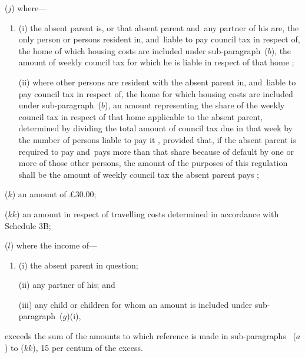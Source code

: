 \documentclass[12pt,a4paper]{article}
\begin{document}
\begin{enumerate}

($j$) where—
\begin{enumerate}\item[]
(i) the absent parent is, or that absent parent and~any partner of his are, the only person or persons resident in, and~liable to pay council tax in respect of, the home of which housing costs are included under sub-paragraph~($b$), the amount of weekly council tax for which he is liable in respect of that home%
;

(ii) where other persons are resident with the absent parent in, and~liable to pay council tax in respect of, the home for which housing costs are included under sub-paragraph~($b$), an amount representing the share of the weekly council tax in respect of that home applicable to the absent parent, determined by dividing the total amount of council tax due in that week by the number of persons liable to pay it%
, provided that, if the absent parent is required to pay and~pays more than that share because of default by one or more of those other persons, the amount of the purposes of this regulation shall be the amount of weekly council tax the absent parent pays%
;
\end{enumerate}

($k$) an amount of 
£30$.$00; %

($kk$) an amount in respect of travelling costs determined in accordance with Schedule 3B;

($l$) where the income of—
\begin{enumerate}\item[]
(i) the absent parent in question;

(ii) any partner of his; and

(iii) any child or children for whom an amount is included under sub-paragraph~($g$)(i),
\end{enumerate}
exceeds the sum of the amounts to which reference is made in sub-paragraphs~
($a$) to ($kk$),  %
15 per centum %
of the excess.
\end{enumerate}
\end{document}
